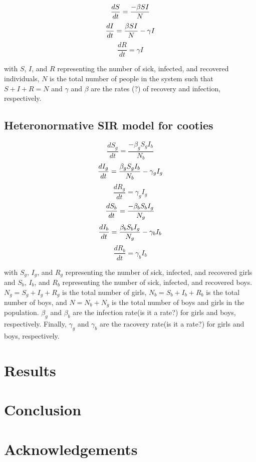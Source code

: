\documentclass[
  12pt,
]{article}
\begin{document}
\[
\frac{dS}{dt} = \frac{-\beta SI}{N}\\
\] \[
\frac{dI}{dt} = \frac{\beta SI}{N} - \gamma I\\
\] \[
\frac{dR}{dt} = \gamma I
\]

with \(S\), \(I\), and \(R\) representing the number of sick, infected,
and recovered individuals, \(N\) is the total number of people in the
system such that \(S + I + R = N\) and \(\gamma\) and \(\beta\) are the
rates (?) of recovery and infection, respectively.

\hypertarget{heteronormative-sir-model-for-cooties}{%
\subsection{Heteronormative SIR model for
cooties}\label{heteronormative-sir-model-for-cooties}}

\[
\frac{dS_g}{dt} = \frac{-\beta_g S_g I_b}{N_b}
\] \[
\frac{dI_g}{dt} = \frac{\beta_g S_g I_b}{N_b} - \gamma_g I_g\\
\] \[
\frac{dR_g}{dt} = \gamma_g I_g
\] \[
\frac{dS_b}{dt} = \frac{-\beta_b S_b I_g}{N_g}\\
\] \[
\frac{dI_b}{dt} = \frac{\beta_b S_b I_g}{N_g} - \gamma_b I_b\\
\] \[
\frac{dR_b}{dt} = \gamma_b I_b
\]

with \(S_g\), \(I_g\), and \(R_g\) representing the number of sick,
infected, and recovered girls and \(S_b\), \(I_b\), and \(R_b\)
representing the number of sick, infected, and recovered boys.
\(N_g = S_g + I_g + R_g\) is the total number of girls,
\(N_b = S_b + I_b + R_b\) is the total number of boys, and
\(N = N_b + N_g\) is the total number of boys and girls in the
population. \(\beta_g\) and \(\beta_b\) are the infection rate(is it a
rate?) for girls and boys, respectively. Finally, \(\gamma_g\) and
\(\gamma_b\) are the racovery rate(is it a rate?) for girls and boys,
respectively.

\hypertarget{sec:results}{%
\section{Results}\label{sec:results}}

\hypertarget{sec:conclusion}{%
\section{Conclusion}\label{sec:conclusion}}

\hypertarget{acknowledgements}{%
\section*{Acknowledgements}\label{acknowledgements}}
\end{document}
